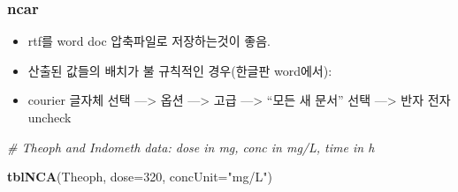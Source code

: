 \documentclass[]{krantz}
\makeatletter
\newenvironment{Shaded}{\begin{snugshade}}{\end{snugshade}}
\newcommand{\KeywordTok}[1]{\textcolor[rgb]{0.13,0.29,0.53}{\textbf{#1}}}
\newcommand{\DataTypeTok}[1]{\textcolor[rgb]{0.13,0.29,0.53}{#1}}
\newcommand{\DecValTok}[1]{\textcolor[rgb]{0.00,0.00,0.81}{#1}}
\newcommand{\StringTok}[1]{\textcolor[rgb]{0.31,0.60,0.02}{#1}}
\newcommand{\CommentTok}[1]{\textcolor[rgb]{0.56,0.35,0.01}{\textit{#1}}}
\newcommand{\NormalTok}[1]{#1}
\providecommand{\tightlist}{%
  \setlength{\itemsep}{0pt}\setlength{\parskip}{0pt}}
\newenvironment{kframe}{%
\medskip{}
\setlength{\fboxsep}{.8em}
 \def\at@end@of@kframe{}%
 \ifinner\ifhmode%
  \def\at@end@of@kframe{\end{minipage}}%
  \begin{minipage}{\columnwidth}%
 \fi\fi%
 \def\FrameCommand##1{\hskip\@totalleftmargin \hskip-\fboxsep
 \colorbox{shadecolor}{##1}\hskip-\fboxsep
     \hskip-\linewidth \hskip-\@totalleftmargin \hskip\columnwidth}%
 \MakeFramed {\advance\hsize-\width
   \@totalleftmargin\z@ \linewidth\hsize
   \@setminipage}}%
 {\par\unskip\endMakeFramed%
 \at@end@of@kframe}
\renewenvironment{Shaded}{\begin{kframe}}{\end{kframe}}
\theoremstyle{definition}
\theoremstyle{definition}
\theoremstyle{definition}
\theoremstyle{remark}
\makeatother
\begin{document}
\subsubsection{ncar}\label{ncar}

\begin{itemize}
\tightlist
\item
  rtf를 word doc 압축파일로 저장하는것이 좋음.
\item
  산출된 값들의 배치가 불 규칙적인 경우(한글판 word에서):
\item
  courier 글자체 선택 ---\textgreater{} 옵션 ---\textgreater{} 고급
  ---\textgreater{} ``모든 새 문서'' 선택 ---\textgreater{} 반자 전자
  uncheck
\end{itemize}

\begin{Shaded}
\begin{Highlighting}[]
\CommentTok{# Theoph and Indometh data: dose in mg, conc in mg/L, time in h}

\KeywordTok{tblNCA}\NormalTok{(Theoph, }\DataTypeTok{dose=}\DecValTok{320}\NormalTok{, }\DataTypeTok{concUnit=}\StringTok{"mg/L"}\NormalTok{)}
\end{Highlighting}
\end{Shaded}
\end{document}
